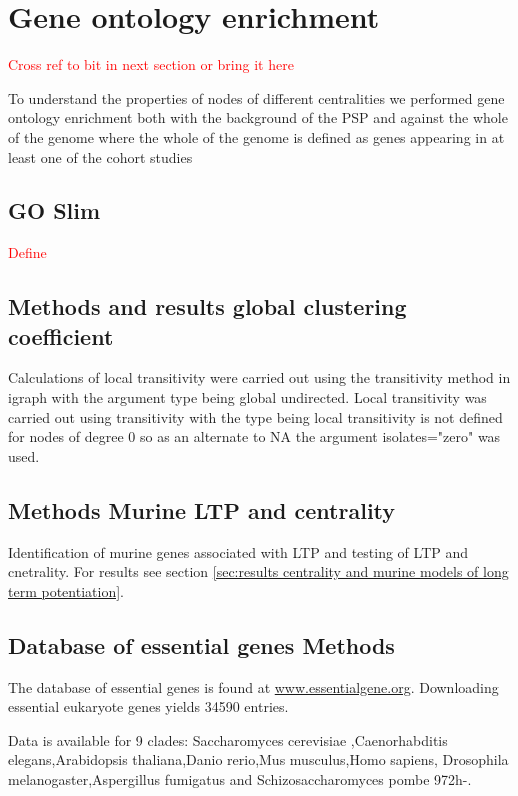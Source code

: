 \section{Gene ontology enrichment}
\textcolor{red}{Cross ref to bit in next section or bring it here}

To understand the properties of nodes of different centralities we performed gene ontology enrichment both with the background of the PSP and against the whole of the genome where the whole of the genome is defined as genes appearing in at least one of the cohort studies 

\subsection{GO Slim}
\textcolor{red}{Define}

\subsection{Methods and results global clustering coefficient}
Calculations of local transitivity were carried out using the transitivity method in igraph with the argument type being global undirected. Local transitivity was carried out using transitivity with the type being local transitivity is not defined for nodes of degree 0 so as an alternate to NA the argument isolates="zero" was used. 

\subsection{Methods Murine LTP and centrality}
Identification of murine genes associated with LTP and testing of LTP and cnetrality. For results see section \ref{sec:results centrality and murine models of long term potentiation}.


\subsection{Database of essential genes Methods}
 \label{sec:Database of essential genes}
 
 
 The database of essential genes is found at \url{www.essentialgene.org}. Downloading essential eukaryote genes yields 34590 entries.
 
 Data is available for 9 clades:  Saccharomyces cerevisiae   ,Caenorhabditis elegans,Arabidopsis thaliana,Danio rerio,Mus musculus,Homo sapiens,
 Drosophila melanogaster,Aspergillus fumigatus and Schizosaccharomyces pombe 972h-.
 
